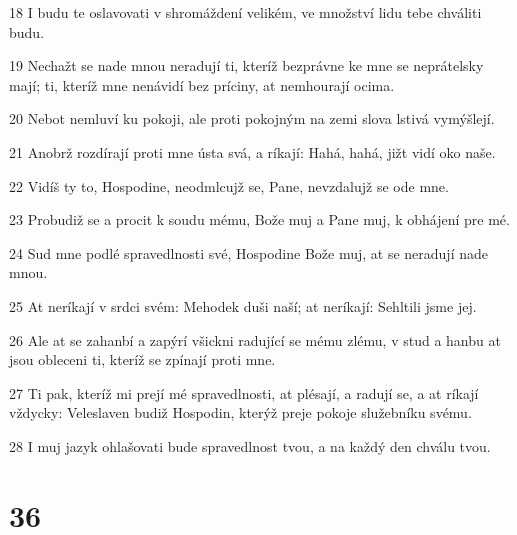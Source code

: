 \par 18 I budu te oslavovati v shromáždení velikém, ve množství lidu tebe chváliti budu.
\par 19 Nechažt se nade mnou neradují ti, kteríž bezprávne ke mne se neprátelsky mají; ti, kteríž mne nenávidí bez príciny, at nemhourají ocima.
\par 20 Nebot nemluví ku pokoji, ale proti pokojným na zemi slova lstivá vymýšlejí.
\par 21 Anobrž rozdírají proti mne ústa svá, a ríkají: Hahá, hahá, jižt vidí oko naše.
\par 22 Vidíš ty to, Hospodine, neodmlcujž se, Pane, nevzdalujž se ode mne.
\par 23 Probudiž se a procit k soudu mému, Bože muj a Pane muj, k obhájení pre mé.
\par 24 Sud mne podlé spravedlnosti své, Hospodine Bože muj, at se neradují nade mnou.
\par 25 At neríkají v srdci svém: Mehodek duši naší; at neríkají: Sehltili jsme jej.
\par 26 Ale at se zahanbí a zapýrí všickni radující se mému zlému, v stud a hanbu at jsou obleceni ti, kteríž se zpínají proti mne.
\par 27 Ti pak, kteríž mi prejí mé spravedlnosti, at plésají, a radují se, a at ríkají vždycky: Veleslaven budiž Hospodin, kterýž preje pokoje služebníku svému.
\par 28 I muj jazyk ohlašovati bude spravedlnost tvou, a na každý den chválu tvou.

\chapter{36}

